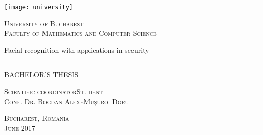 \begin{titlepage}
	\begin{center}

		\texttt{[image: university]}

		\vspace{0.5cm}
		\LARGE \textsc{University of Bucharest}
		\\
		\vspace{0.5cm}
		\Large \textsc{Faculty of Mathematics and Computer Science}

		\vfill

		\Huge Facial recognition with applications in security
		\rule{\textwidth}{1pt}
		\Large BACHELOR'S THESIS

		\vfill

		\Large
		\textsc{Scientific coordinator}\hfill \textsc{Student}
		\\
		\large
		\textsc{Conf. Dr. Bogdan Alexe}\hfill \textsc{Mușuroi Doru}
	
		\vspace{1.5cm}
		\textsc{Bucharest, Romania}\\
		\textsc{June 2017}

	\end{center}
\end{titlepage}
 
